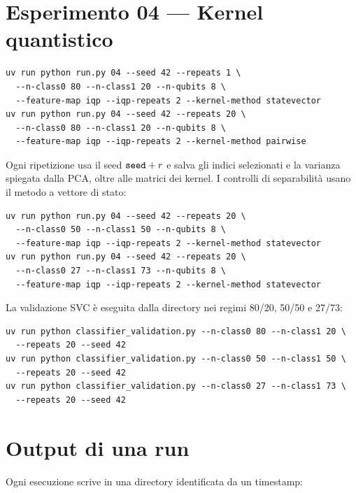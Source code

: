 \section{Esperimento 04 --- Kernel quantistico}

\begin{lstlisting}[style=shell, numbers=none]
uv run python run.py 04 --seed 42 --repeats 1 \
  --n-class0 80 --n-class1 20 --n-qubits 8 \
  --feature-map iqp --iqp-repeats 2 --kernel-method statevector
uv run python run.py 04 --seed 42 --repeats 20 \
  --n-class0 80 --n-class1 20 --n-qubits 8 \
  --feature-map iqp --iqp-repeats 2 --kernel-method pairwise
\end{lstlisting}

Ogni ripetizione usa il seed $\texttt{seed} + r$ e salva gli indici selezionati e
la varianza spiegata dalla PCA, oltre alle matrici dei kernel. I controlli di
separabilità usano il metodo a vettore di stato:

\begin{lstlisting}[style=shell, numbers=none]
uv run python run.py 04 --seed 42 --repeats 20 \
  --n-class0 50 --n-class1 50 --n-qubits 8 \
  --feature-map iqp --iqp-repeats 2 --kernel-method statevector
uv run python run.py 04 --seed 42 --repeats 20 \
  --n-class0 27 --n-class1 73 --n-qubits 8 \
  --feature-map iqp --iqp-repeats 2 --kernel-method statevector
\end{lstlisting}

La validazione SVC è eseguita dalla directory
\file{experiments/04\_quantum\_kernel} nei regimi 80/20, 50/50 e 27/73:

\begin{lstlisting}[style=shell, numbers=none]
uv run python classifier_validation.py --n-class0 80 --n-class1 20 \
  --repeats 20 --seed 42
uv run python classifier_validation.py --n-class0 50 --n-class1 50 \
  --repeats 20 --seed 42
uv run python classifier_validation.py --n-class0 27 --n-class1 73 \
  --repeats 20 --seed 42
\end{lstlisting}

\section{Output di una run}

Ogni esecuzione scrive in una directory identificata da un timestamp:

